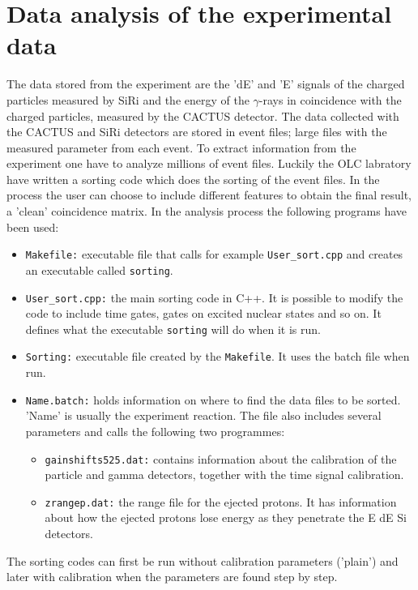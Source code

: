 \documentclass[11pt,a4wide]{article}
\begin{document}
\section{Data analysis of the experimental data}
The data stored from the experiment are the 'dE' and 'E' signals of the charged particles measured by SiRi and the energy of the $\gamma$-rays in coincidence with the charged particles, measured by the CACTUS detector. The data collected with the CACTUS and SiRi detectors are stored in event files; large files with the measured parameter from each event. To extract information from the experiment one have to analyze millions of event files. Luckily the OLC labratory have written a sorting code which does the sorting of the event files. In the process the user can choose to include different features to obtain the final result, a 'clean' coincidence matrix. In the analysis process the following programs have been used:
\begin{itemize}
\item \texttt{Makefile:} executable file that calls for example \texttt{User\_sort.cpp} and creates an executable called \texttt{sorting}.
\item \texttt{User\_sort.cpp:} the main sorting code in C++. It is possible to modify the code to include time gates, gates on excited nuclear states and so on. It defines what the executable \texttt{sorting} will do when it is run. 
\item \texttt{Sorting:} executable file created by the \texttt{Makefile}. It uses the batch file when run.
\item \texttt{Name.batch:} holds information on where to find the data files to be sorted. 'Name' is usually the experiment reaction. The file also includes several parameters and calls the following two programmes:
\begin{itemize}
\item \texttt{gainshifts525.dat:} contains information about the calibration of the particle and gamma detectors, together with the time signal calibration.
\item \texttt{zrangep.dat:} the range file for the ejected protons. It has information about how the ejected protons lose energy as they penetrate the E dE Si detectors.
\end{itemize}
\end{itemize}
The sorting codes can first be run without calibration parameters ('plain') and later with calibration when the parameters are found step by step.
\end{document}
